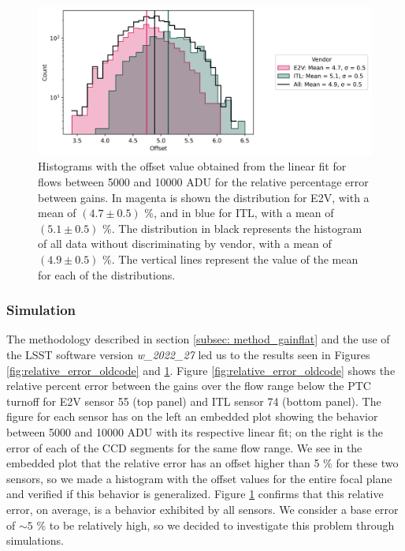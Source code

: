 \begin{figure}[!htb]
    \centering
    \includegraphics[width=\textwidth]{Figures/Histogram_offset_old.png}
    \caption{Histograms with the offset value obtained from the linear fit for flows between 5000 and 10000 ADU for the relative percentage error between gains. In magenta is shown the distribution for E2V, with a mean of $(4.7 \pm 0.5)$ \%, and in blue for ITL, with a mean of $(5.1 \pm 0.5)$ \%. The distribution in black represents the histogram of all data without discriminating by vendor, with a mean of $(4.9 \pm 0.5)$ \%. The vertical lines represent the value of the mean for each of the distributions.}
    \label{fig:hist_offset_old}
\end{figure}

\subsubsection{Simulation} \label{subsubsec:method_Simulation_Gain}

The methodology described in section \ref{subsec: method_gainflat} and the use of the LSST software version \textit{w\_2022\_27} led us to the results seen in Figures \ref{fig:relative_error_oldcode} and \ref{fig:hist_offset_old}. Figure \ref{fig:relative_error_oldcode} shows the relative percent error between the gains over the flow range below the PTC turnoff for E2V sensor 55 (top panel) and ITL sensor 74 (bottom panel). The figure for each sensor has on the left an embedded plot showing the behavior between 5000 and 10000 ADU with its respective linear fit; on the right is the error of each of the CCD segments for the same flow range.  We see in the embedded plot that the relative error has an offset higher than 5 \% for these two sensors, so we made a histogram with the offset values for the entire focal plane and verified if this behavior is generalized. Figure \ref{fig:hist_offset_old} confirms that this relative error, on average, is a behavior exhibited by all sensors. We consider a base error of $\sim 5$ \% to be relatively high, so we decided to investigate this problem through simulations.

